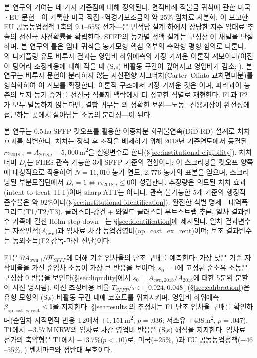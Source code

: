 \documentclass[12pt, a4paper]{article}
\begin{document}
본 연구의 기여는 네 가지 기준점에 대해 정의된다. 면적비례 직불금 귀착에 관한 미국·EU 문헌---\citet{Kirwan2009_rentcap}이 기록한 미국 직접·역경기보조금의 약 25\% 임차료 자본화, \citet{BaldoniCiaian2023_eucap}이 보고한 EU 공동농업정책 1축의 $9.1$--$55\%$ 전가---은 면적당 설계 하에서 상당한 지주 임대료 추출의 선진국 사전확률을 확립한다. SFFP의 농가별 정액 설계는 구성상 이 채널을 단절하며, 본 연구의 틀은 임대 귀착을 농가모형 핵심 외부의 축약형 평형 함의로 다룬다. \citet{Kazukauskas2013_disinvestment}의 디커플링 유도 비투자 결과는 영업비 하위예측의 가장 가까운 이론적 계보이다(이전이 덩어리 조정비용에 대해 작을 때 (S,s) 비활동 구간이 깊어지고 영업비가 감소; \citealp{CaballeroEngel1999_lumpy}). 본 연구는 비투자 문헌이 분리하지 않는 자산편향 시그너처(Carter--Olinto 교차편미분)를 형식화하여 이 계보를 확장한다. 이론적 구조에서 가장 가까운 것은 \citet{CarterOlinto2003_liquidity}이며, 파라과이 농촌의 토지 등기 증거를 선진국 직불제 맥락에서 더 정교한 식별로 재현한다. F1과 F2가 모두 발동하지 않는다면, 결합 귀무는 \citet{LaFaveThomas2016_markets}의 정확한 보완---노동·신용시장이 완전성에 접근하는 곳에서 살아남는 소농의 분리성---이 된다.

본 연구는 0.5\,ha SFFP 컷오프를 활용한 이중차분-회귀불연속(DiD-RD) 설계로 처치효과를 식별한다. 처치는 정책 후 조작을 배제하기 위해 2018년 기준연도에서 동결된 $rv_{2018,i} = A_{2018,i} - 5{,}000$\,m\textsuperscript{2}을 실행변수로 한다(\S\ref{sec:institutional-eligibility}). 처치 더미 $D_i$는 FHES 관측 가능한 3개 SFFP 기준의 결합이다; 이 스크리닝을 컷오프 양쪽에 대칭적으로 적용하여 $N = 11{,}010$ 농가-연도, $2{,}776$ 농가의 표본을 얻으며, 스크리닝된 부분모집단에서 $D_i = 1 \iff rv_{2018,i} \le 0$이 성립한다. 추정량은 의도된 처치 효과(intent-to-treat, ITT)이며 sharp ATT는 아니다. 관측 불가능한 5개 기준의 행정적 준수율은 약 92\%이다(\S\ref{sec:institutional-identification}). 완전한 식별 명세---대역폭 그리드(T1/T2/T3), 클러스터-강건 + 와일드 클러스터 부트스트랩 추론, 일차 결과변수 가족에 걸친 Holm step-down---는 \S\ref{sec:identification}에 제시된다. 일차 결과변수는 자작면적($A_{\text{own}}$)과 임차료 차감 농업경영비(op\_cost\_ex\_rent)이며; 보조 결과변수는 농외소득(F2 감독-마진 진단)이다.

F1은 $\partial A_{\text{own},i} / \partial T_{SFFP}$에 대해 기준 임차율의 단조 구배를 예측한다: 가장 낮은 기준 자작비율을 가진 순임차 소농이 가장 큰 반응을 보이며; $s_0 = 1$에 고정된 순소유 소농은 구성상 0 반응을 보인다(\S\ref{sec:liquidity}에서 $s_0 = A_{\text{own},2018}/A_{2018}$에 대한 5분위 분할이 사전 명시됨). 이전-조정비용 비율 $T_{SFFP}/\tau \in [0.024, 0.048]$(\S\ref{sec:calibration})은 \citet{CaballeroEngel1999_lumpy} 유형 모형의 (S,s) 비활동 구간 내에 코호트를 위치시키며, 영업비 하위예측 $\beta_{\text{op\_cost\_ex\_rent}} \le 0$을 지지한다. \S\ref{sec:results}의 추정치는 F1 단조 임차율 구배를 확인하며(순임차 자작면적 반응 T2에서 $+1{,}151$\,m\textsuperscript{2}, $p = .036$; 저소유 $+438$\,m\textsuperscript{2}, $p = .047$), T1에서 $-3.57$\,M\,KRW의 임차료 차감 영업비 반응은 (S,s) 해석을 지지한다. 임차료 전가의 축약형은 T1에서 $-13.7\%$($p < .10$)로, 미국($+25\%$, \citealp{Kirwan2009_rentcap})과 EU 공동농업정책($+46$--$55\%$, \citealp{BaldoniCiaian2023_eucap}) 벤치마크와 정반대 부호이다.
\end{document}
